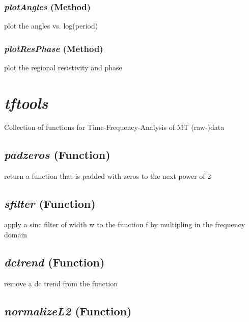 \subsubsection{\textit{plotAngles} (Method)}
\label{sssec:processing.striketools.Strike.plotAngles}

plot the angles vs. log(period)

\subsubsection{\textit{plotResPhase} (Method)}
\label{sssec:processing.striketools.Strike.plotResPhase}

plot the regional resistivity and phase




\section{\textit{tftools} }
\label{sec:processing.tftools}

Collection of functions for Time-Frequency-Analysis of MT (raw-)data

\subsection{\textit{padzeros} (Function)}
\label{ssec:processing.tftools.padzeros}

return a function that is padded with zeros to the next
    power of 2

\subsection{\textit{sfilter} (Function)}
\label{ssec:processing.tftools.sfilter}

apply a sinc filter of width w to the function f by multipling in
    the frequency domain

\subsection{\textit{dctrend} (Function)}
\label{ssec:processing.tftools.dctrend}

remove a dc trend from the function 

\subsection{\textit{normalizeL2} (Function)}
\label{ssec:processing.tftools.normalizeL2}

